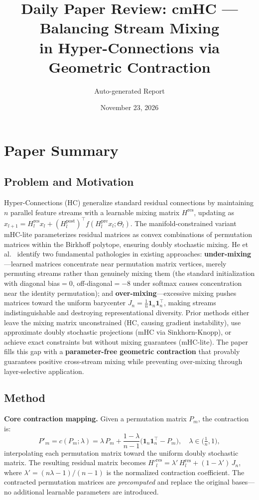 \documentclass[11pt,a4paper]{article}
\title{Daily Paper Review: cmHC --- Balancing Stream Mixing\\in Hyper-Connections via Geometric Contraction}
\author{Auto-generated Report}
\date{November 23, 2026}
\begin{document}
\maketitle

\section{Paper Summary}

\subsection{Problem and Motivation}
Hyper-Connections (HC) generalize standard residual connections by maintaining $n$ parallel feature streams with a learnable mixing matrix $H^{\mathrm{res}}$, updating as $x_{l+1} = H^{\mathrm{res}}_l x_l + (H^{\mathrm{post}}_l)^\top f(H^{\mathrm{pre}}_l x_l; \Theta_l)$. The manifold-constrained variant mHC-lite parameterizes residual matrices as convex combinations of permutation matrices within the Birkhoff polytope, ensuring doubly stochastic mixing. He et al.~\cite{he2026cmhc} identify two fundamental pathologies in existing approaches: \textbf{under-mixing}---learned matrices concentrate near permutation matrix vertices, merely permuting streams rather than genuinely mixing them (the standard initialization with diagonal bias${}=0$, off-diagonal${}=-8$ under softmax causes concentration near the identity permutation); and \textbf{over-mixing}---excessive mixing pushes matrices toward the uniform barycenter $J_n = \frac{1}{n}\mathbf{1}_n\mathbf{1}_n^\top$, making streams indistinguishable and destroying representational diversity. Prior methods either leave the mixing matrix unconstrained (HC, causing gradient instability), use approximate doubly stochastic projections (mHC via Sinkhorn-Knopp), or achieve exact constraints but without mixing guarantees (mHC-lite). The paper fills this gap with a \textbf{parameter-free geometric contraction} that provably guarantees positive cross-stream mixing while preventing over-mixing through layer-selective application.

\subsection{Method}
\textbf{Core contraction mapping.} Given a permutation matrix $P_m$, the contraction is:
\[
  P'_m = c(P_m; \lambda) = \lambda\, P_m + \frac{1-\lambda}{n-1}\bigl(\mathbf{1}_n\mathbf{1}_n^\top - P_m\bigr), \quad \lambda \in \bigl(\tfrac{1}{n}, 1\bigr),
\]
interpolating each permutation matrix toward the uniform doubly stochastic matrix. The resulting residual matrix becomes $H'^{\mathrm{res}}_l = \lambda'\, H^{\mathrm{res}}_l + (1-\lambda')\, J_n$, where $\lambda' = (n\lambda - 1)/(n-1)$ is the normalized contraction coefficient. The contracted permutation matrices are \emph{precomputed} and replace the original bases---no additional learnable parameters are introduced.
\end{document}
